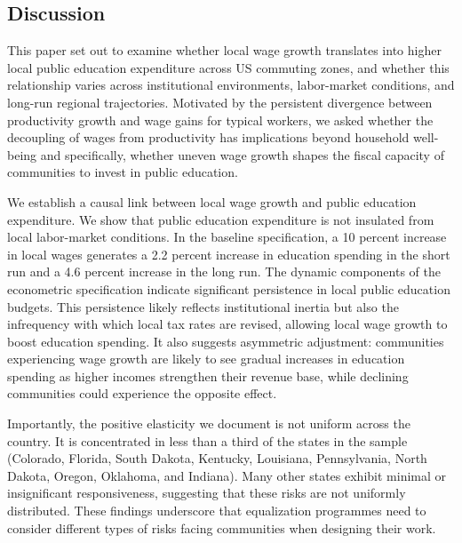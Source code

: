 \documentclass[
  10pt,
]{article}
\begin{document}
\subsection{Discussion}\label{discussion}

This paper set out to examine whether local wage growth translates into
higher local public education expenditure across US commuting zones, and
whether this relationship varies across institutional environments,
labor-market conditions, and long-run regional trajectories. Motivated
by the persistent divergence between productivity growth and wage gains
for typical workers, we asked whether the decoupling of wages from
productivity has implications beyond household well-being and
specifically, whether uneven wage growth shapes the fiscal capacity of
communities to invest in public education.

We establish a causal link between local wage growth and public
education expenditure. We show that public education expenditure is not
insulated from local labor-market conditions. In the baseline
specification, a 10 percent increase in local wages generates a 2.2
percent increase in education spending in the short run and a 4.6
percent increase in the long run. The dynamic components of the
econometric specification indicate significant persistence in local
public education budgets. This persistence likely reflects institutional
inertia but also the infrequency with which local tax rates are revised,
allowing local wage growth to boost education spending. It also suggests
asymmetric adjustment: communities experiencing wage growth are likely
to see gradual increases in education spending as higher incomes
strengthen their revenue base, while declining communities could
experience the opposite effect.

Importantly, the positive elasticity we document is not uniform across
the country. It is concentrated in less than a third of the states in
the sample (Colorado, Florida, South Dakota, Kentucky, Louisiana,
Pennsylvania, North Dakota, Oregon, Oklahoma, and Indiana). Many other
states exhibit minimal or insignificant responsiveness, suggesting that
these risks are not uniformly distributed. These findings underscore
that equalization programmes need to consider different types of risks
facing communities when designing their work.
\end{document}
